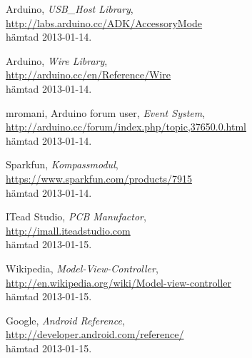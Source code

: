 \begin{thebibliography}{9}
Arduino,
\emph{USB\_Host Library}, \\
\url{http://labs.arduino.cc/ADK/AccessoryMode} \\
hämtad 2013-01-14.

Arduino,
\emph{Wire Library}, \\
\url{http://arduino.cc/en/Reference/Wire} \\
hämtad 2013-01-14.

mromani, Arduino forum user,
\emph{Event System}, \\
\url{http://arduino.cc/forum/index.php/topic,37650.0.html} \\
hämtad 2013-01-14.

Sparkfun,
\emph{Kompassmodul}, \\
\url{https://www.sparkfun.com/products/7915} \\
hämtad 2013-01-14.

ITead Studio,
\emph{PCB Manufactor}, \\
\url{http://imall.iteadstudio.com} \\
hämtad 2013-01-15.

Wikipedia,
\emph{Model-View-Controller}, \\
\url{http://en.wikipedia.org/wiki/Model-view-controller} \\
hämtad 2013-01-15.

Google,
\emph{Android Reference}, \\
\url{http://developer.android.com/reference/} \\
hämtad 2013-01-15.
\end{thebibliography}
